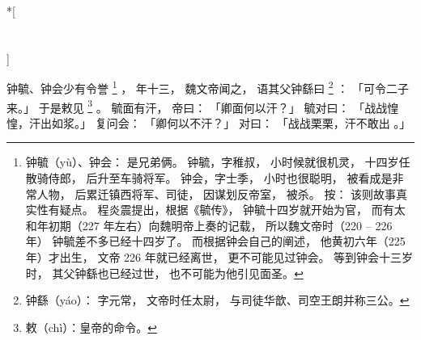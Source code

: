 
\switchcolumn[0]*[\section{}]

钟毓、钟会少有令誉%
\footnote{%
    钟毓（yù）、钟会：
        是兄弟俩。
        钟毓，字稚叔，
        小时候就很机灵，
        十四岁任散骑侍郎，
        后升至车骑将军。
        钟会，字士季，
        小时也很聪明，
        被看成是非常人物，
        后累迁镇西将军、司徒，
        因谋划反帝室，
        被杀。
    按：
        该则故事真实性有疑点。
        程炎震提出，根据《毓传》，
        钟毓十四岁就开始为官，
        而有太和年初期（227 年左右）向魏明帝上奏的记载，
        所以魏文帝时（220 -- 226 年）
        钟毓差不多已经十四岁了。
        而根据钟会自己的阐述，
        他黄初六年（225 年）才出生，
        文帝 226 年就已经离世，
        更不可能见过钟会。
        等到钟会十三岁时，
        其父钟繇也已经过世，
        也不可能为他引见面圣。
}%
，
年十三，
魏文帝闻之，
语其父钟繇曰%
\footnote{%
    钟繇（yáo）：
        字元常，
        文帝时任太尉，
        与司徒华歆、司空王朗并称三公。
}%
：
「可令二子来。」
于是敕见%
\footnote{%
    敕（chì）：皇帝的命令。
}%
。
毓面有汗，
帝曰：
「卿面何以汗？」
毓对曰：
「战战惶惶，汗出如浆。」
复问会：
「卿何以不汗？」
对曰：
「战战栗栗，汗不敢出 。」

\switchcolumn



